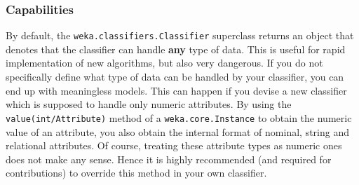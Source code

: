 \newpage
\subsubsection*{Capabilities}
\label{classifier_capabilities}
By default, the \texttt{weka.classifiers.Classifier} superclass returns an
object that denotes that the classifier can handle \textbf{any} type of data.
This is useful for rapid implementation of new algorithms, but also very
dangerous. If you do not specifically define what type of data can be handled by
your classifier, you can end up with meaningless models. This can happen if you
devise a new classifier which is supposed to handle only numeric attributes. By
using the \texttt{value(int/Attribute)} method of a \texttt{weka.core.Instance}
to obtain the numeric value of an attribute, you also obtain the internal format
of nominal, string and relational attributes. Of course, treating these
attribute types as numeric ones does not make any sense. Hence it is highly
recommended (and required for contributions) to override this method in your own
classifier. \\

